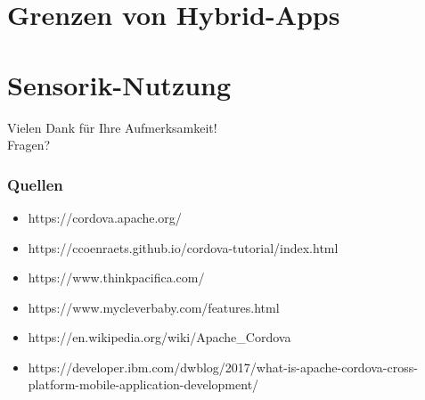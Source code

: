 \documentclass[xcolor=dvipsnames]{beamer}
\begin{document}
\section{Grenzen von Hybrid-Apps}
\section{Sensorik-Nutzung}

\begin{frame}
	\centering
	\textcolor{cordovablue}{{\LARGE Vielen Dank für Ihre Aufmerksamkeit!\\[6ex] Fragen?}}
\end{frame}

\begin{frame}\frametitle{Quellen}
\begin{itemize}
	\item https://cordova.apache.org/
	\item https://ccoenraets.github.io/cordova-tutorial/index.html
	\item https://www.thinkpacifica.com/
	\item https://www.mycleverbaby.com/features.html
	\item https://en.wikipedia.org/wiki/Apache\_Cordova
	\item https://developer.ibm.com/dwblog/2017/what-is-apache-cordova-cross-platform-mobile-application-development/
\end{itemize}
\end{frame}
\end{document}
